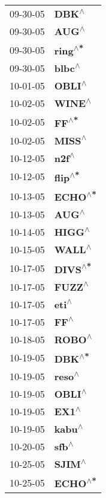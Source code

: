 \begin{supertabular}{p{0.08\textwidth}p{0.2\textwidth}}
 09-30-05 &     \textbf{DBK\textsuperscript{$\wedge$}} \\
 09-30-05 &     \textbf{AUG\textsuperscript{$\wedge$}} \\
 09-30-05 &   \textbf{ring\textsuperscript{$\wedge$*}} \\
 09-30-05 &    \textbf{blbc\textsuperscript{$\wedge$}} \\
 10-01-05 &    \textbf{OBLI\textsuperscript{$\wedge$}} \\
 10-02-05 &    \textbf{WINE\textsuperscript{$\wedge$}} \\
 10-02-05 &     \textbf{FF\textsuperscript{$\wedge$*}} \\
 10-02-05 &    \textbf{MISS\textsuperscript{$\wedge$}} \\
 10-12-05 &     \textbf{n2f\textsuperscript{$\wedge$}} \\
 10-12-05 &   \textbf{flip\textsuperscript{$\wedge$*}} \\
 10-13-05 &   \textbf{ECHO\textsuperscript{$\wedge$*}} \\
 10-13-05 &     \textbf{AUG\textsuperscript{$\wedge$}} \\
 10-14-05 &    \textbf{HIGG\textsuperscript{$\wedge$}} \\
 10-15-05 &    \textbf{WALL\textsuperscript{$\wedge$}} \\
 10-17-05 &   \textbf{DIVS\textsuperscript{$\wedge$*}} \\
 10-17-05 &    \textbf{FUZZ\textsuperscript{$\wedge$}} \\
 10-17-05 &     \textbf{eti\textsuperscript{$\wedge$}} \\
 10-17-05 &      \textbf{FF\textsuperscript{$\wedge$}} \\
 10-18-05 &    \textbf{ROBO\textsuperscript{$\wedge$}} \\
 10-19-05 &    \textbf{DBK\textsuperscript{$\wedge$*}} \\
 10-19-05 &    \textbf{reso\textsuperscript{$\wedge$}} \\
 10-19-05 &    \textbf{OBLI\textsuperscript{$\wedge$}} \\
 10-19-05 &     \textbf{EX1\textsuperscript{$\wedge$}} \\
 10-19-05 &    \textbf{kabu\textsuperscript{$\wedge$}} \\
 10-20-05 &     \textbf{sfb\textsuperscript{$\wedge$}} \\
 10-25-05 &    \textbf{SJIM\textsuperscript{$\wedge$}} \\
 10-25-05 &   \textbf{ECHO\textsuperscript{$\wedge$*}} \\

\end{supertabular}
